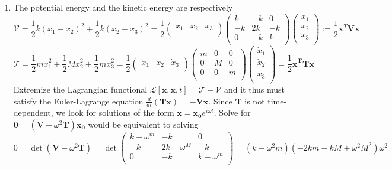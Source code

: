 \documentclass[a4paper]{article}
\begin{document}
\newpage
\begin{ans}\leavevmode
\begin{enumerate}[label=(\roman*)]
\item The potential energy and the kinetic energy are respectively
$$\mathcal{V}=\frac{1}{2}k(x_1-x_2)^2+\frac{1}{2}k(x_2-x_3)^2=\frac{1}{2}\begin{pmatrix}x_1&x_2&x_3\\\end{pmatrix}\begin{pmatrix}k&-k&0\\-k&2k&-k\\0&-k&k\\\end{pmatrix}\begin{pmatrix}x_1\\x_2\\x_3\\\end{pmatrix}:=\frac{1}{2}\mathbf{x}^T\mathbf{V}\mathbf{x}$$
$$\mathcal{T}=\frac{1}{2}m\dot{x}_1^2+\frac{1}{2}M\dot{x}_2^2+\frac{1}{2}m\dot{x}_3^2=\frac{1}{2}\begin{pmatrix}\dot{x}_1&\dot{x}_2&\dot{x}_3\\\end{pmatrix}\begin{pmatrix}m&0&0\\0&M&0\\0&0&m\\\end{pmatrix}\begin{pmatrix}\dot{x}_1\\\dot{x}_2\\\dot{x}_3\\\end{pmatrix}=\frac{1}{2}\mathbf{\dot{x}^TT\dot{x}}$$
Extremize the Lagrangian functional $\mathcal{L}[\mathbf{x},\mathbf{\dot{x}},t]=\mathcal{T}-\mathcal{V}$ and it thus must satisfy the Euler-Lagrange equation $\frac{d}{dt}(\mathbf{T\dot{x}})=-\mathbf{Vx}$. Since $\mathbf{T}$ is not time-dependent, we look for solutions of the form $\mathbf{x}=\mathbf{x_0}e^{i\omega t}$. Solve for $\boldsymbol{0}=(\mathbf{V}-\omega^2\mathbf{T})\mathbf{x_0}$ would be equivalent to solving $$0=\det(\mathbf{V}-\omega^2\mathbf{T})=\det\begin{pmatrix}k-\omega^m&-k&0\\-k&2k-\omega^M&-k\\0&-k&k-\omega^m\\\end{pmatrix}=(k-\omega^2m)(-2km-kM+\omega^2M^2)\omega^2$$

\end{enumerate}
\end{ans}
\end{document}
